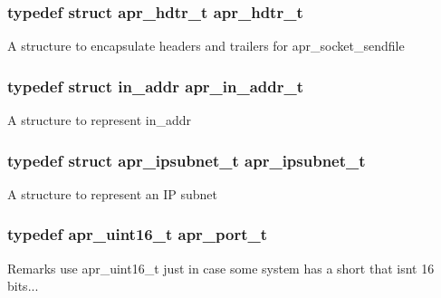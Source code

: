 \subsubsection[{\texorpdfstring{apr\+\_\+hdtr\+\_\+t}{apr_hdtr_t}}]{\setlength{\rightskip}{0pt plus 5cm}typedef struct {\bf apr\+\_\+hdtr\+\_\+t} {\bf apr\+\_\+hdtr\+\_\+t}}\hypertarget{group__apr__network__io_ga97887d5358a9c79c241ccafab61d8ff5}{}\label{group__apr__network__io_ga97887d5358a9c79c241ccafab61d8ff5}
A structure to encapsulate headers and trailers for apr\+\_\+socket\+\_\+sendfile 
\subsubsection[{\texorpdfstring{apr\+\_\+in\+\_\+addr\+\_\+t}{apr_in_addr_t}}]{\setlength{\rightskip}{0pt plus 5cm}typedef struct in\+\_\+addr {\bf apr\+\_\+in\+\_\+addr\+\_\+t}}\hypertarget{group__apr__network__io_gad30d6c55a354a9a2e0a8747abb0c8176}{}\label{group__apr__network__io_gad30d6c55a354a9a2e0a8747abb0c8176}
A structure to represent in\+\_\+addr 
\subsubsection[{\texorpdfstring{apr\+\_\+ipsubnet\+\_\+t}{apr_ipsubnet_t}}]{\setlength{\rightskip}{0pt plus 5cm}typedef struct {\bf apr\+\_\+ipsubnet\+\_\+t} {\bf apr\+\_\+ipsubnet\+\_\+t}}\hypertarget{group__apr__network__io_gac86ee04eb80f938902095d1d0a67c324}{}\label{group__apr__network__io_gac86ee04eb80f938902095d1d0a67c324}
A structure to represent an IP subnet 
\subsubsection[{\texorpdfstring{apr\+\_\+port\+\_\+t}{apr_port_t}}]{\setlength{\rightskip}{0pt plus 5cm}typedef {\bf apr\+\_\+uint16\+\_\+t} {\bf apr\+\_\+port\+\_\+t}}\hypertarget{group__apr__network__io_gaa670a71960f6eb4fe0d0de2a1e7aba03}{}\label{group__apr__network__io_gaa670a71960f6eb4fe0d0de2a1e7aba03}
\begin{DoxyRemark}{Remarks}
use apr\+\_\+uint16\+\_\+t just in case some system has a short that isn\textquotesingle{}t 16 bits... 
\end{DoxyRemark}
